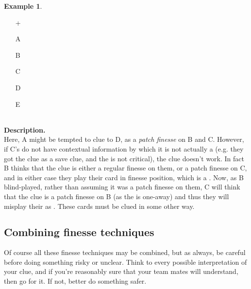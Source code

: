 \documentclass[a4paper]{article}
\theoremstyle{plain}
\theoremstyle{definition}
\newtheorem{example}[theorem]{Example}
\begin{document}
\begin{example}	\hfill \\
	\begin{minipage}{0.45\textwidth}
		\begin{itemize}
			\item[\Large +]      
			\item[\Large A]    
			\item[\Large B]    
			\item[\Large C]     
			\item[\Large D]    
			\item[\Large E]    
		\end{itemize}
	\end{minipage}%
	\begin{minipage}{0.55\textwidth}
		\hfill \\
		
		\textbf{Description.} \\
		
		Here, A might be tempted to clue  to D, as a \emph{patch finesse} on B and C. However, if C's  do not have contextual information by which it is not actually a  (e.g. they got the  clue as a save clue, and the  is not critical), the clue doesn't work. In fact B thinks that the clue is either a regular finesse on them, or a patch finesse on C, and in either case they play their card in finesse position, which is a . Now, as B blind-played, rather than assuming it was a patch finesse on them, C will think that the clue is a patch finesse on B (as the  is one-away) and thus they will misplay their  as . These cards must be clued in some other way.
	\end{minipage}
\end{example} \vspace{0.15 cm}

\subsection{Combining finesse techniques}

Of course all these finesse techniques may be combined, but as always, be careful before doing something risky or unclear. Think to every possible interpretation of your clue, and if you're reasonably sure that your team mates will understand, then go for it. If not, better do something safer.
\end{document}
